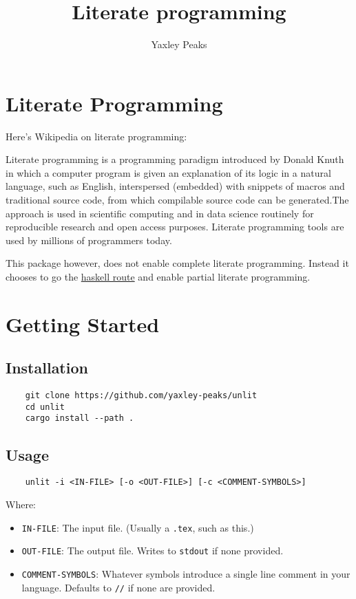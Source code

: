 \documentclass{article}
\title{Literate programming}
\author{Yaxley Peaks}
\begin{document}
\maketitle
\section*{Literate Programming}
Here's Wikipedia on literate programming:
\begin{displayquote}
    Literate programming is a programming paradigm introduced by Donald Knuth in which a computer program is given an explanation of its logic in a natural language, such as English, interspersed (embedded) with snippets of macros and traditional source code, from which compilable source code can be generated.The approach is used in scientific computing and in data science routinely for reproducible research and open access purposes. Literate programming tools are used by millions of programmers today.
\end{displayquote}

This package however, does not enable complete literate programming. Instead it chooses to go the \href{https://wiki.haskell.org/Literate_programming}{haskell route} and enable partial literate programming.

\section{Getting Started}
\subsection{Installation}
\begin{verbatim}
    git clone https://github.com/yaxley-peaks/unlit
    cd unlit
    cargo install --path .
\end{verbatim}
\subsection{Usage}
\begin{verbatim}
    unlit -i <IN-FILE> [-o <OUT-FILE>] [-c <COMMENT-SYMBOLS>]
\end{verbatim}

Where:
\begin{itemize}
    \item \verb|IN-FILE|: The input file. (Usually a \verb|.tex|, such as this.)
    \item \verb|OUT-FILE|: The output file. Writes to \verb|stdout| if none provided.
    \item \verb|COMMENT-SYMBOLS|: Whatever symbols introduce a single line comment in your language. Defaults to \verb|//| if none are provided.
\end{itemize}
\end{document}
